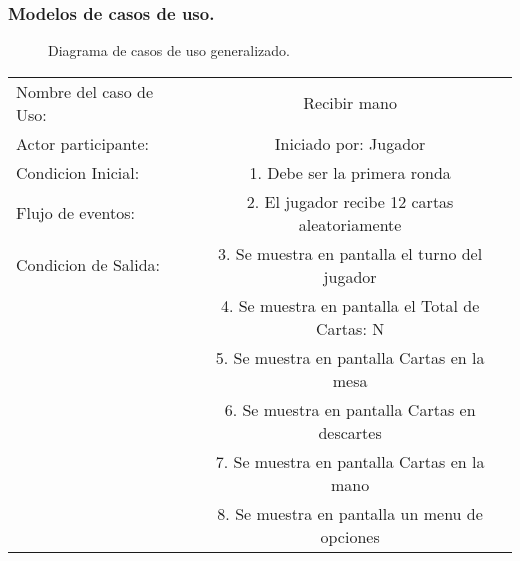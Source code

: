 \subsubsection{Modelos de casos de uso.}\label{cap:modelos-casos-uso}
\clearpage
\begin{figure}[h]
    \centering
    \caption{Diagrama de casos de uso generalizado.}
\end{figure}
\begin{center}
    \begin{tabular}{ l | c  }
        Nombre del caso de Uso: & Recibir mano                                    \\
        Actor participante:     & Iniciado por: Jugador                           \\\hline
        Condicion Inicial:      & 1. Debe ser la primera ronda                    \\
        Flujo de eventos:       & 2. El jugador recibe 12 cartas aleatoriamente   \\\hline
        Condicion de Salida:    & 3. Se muestra en pantalla el turno del jugador  \\
                                & 4. Se muestra en pantalla el Total de Cartas: N \\
                                & 5. Se muestra en pantalla Cartas en la mesa     \\
                                & 6. Se muestra en pantalla Cartas en descartes   \\
                                & 7. Se muestra en pantalla Cartas en la mano     \\
                                & 8. Se muestra en pantalla un menu de opciones   \\ 
    \end{tabular} \\
\end{center}
